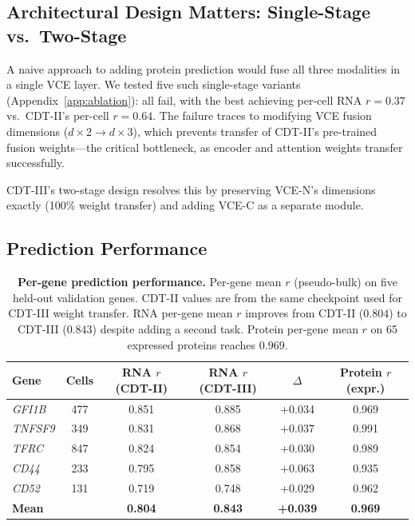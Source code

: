 \documentclass{article}
\begin{document}
\subsection{Architectural Design Matters: Single-Stage vs.\ Two-Stage}
\label{sec:ablation}

A naive approach to adding protein prediction would fuse all three modalities in a single VCE layer. We tested five such single-stage variants (Appendix~\ref{app:ablation}): all fail, with the best achieving per-cell RNA $r = 0.37$ vs.\ CDT-II's per-cell $r = 0.64$. The failure traces to modifying VCE fusion dimensions ($d \times 2 \to d \times 3$), which prevents transfer of CDT-II's pre-trained fusion weights---the critical bottleneck, as encoder and attention weights transfer successfully.

CDT-III's two-stage design resolves this by preserving VCE-N's dimensions exactly (100\% weight transfer) and adding VCE-C as a separate module.

\subsection{Prediction Performance}
\label{sec:prediction}

\begin{table}[t]
\centering
\caption{\textbf{Per-gene prediction performance.} Per-gene mean $r$ (pseudo-bulk) on five held-out validation genes. CDT-II values are from the same checkpoint used for CDT-III weight transfer. RNA per-gene mean $r$ improves from CDT-II ($0.804$) to CDT-III ($0.843$) despite adding a second task. Protein per-gene mean $r$ on 65 expressed proteins reaches $0.969$.}
\label{tab:prediction}
\begin{tabular}{lccccc}
\toprule
Gene & Cells & RNA $r$ (CDT-II) & RNA $r$ (CDT-III) & $\Delta$ & Protein $r$ (expr.) \\
\midrule
\textit{GFI1B} & 477 & 0.851 & 0.885 & +0.034 & 0.969 \\
\textit{TNFSF9} & 349 & 0.831 & 0.868 & +0.037 & 0.991 \\
\textit{TFRC} & 847 & 0.824 & 0.854 & +0.030 & 0.989 \\
\textit{CD44} & 233 & 0.795 & 0.858 & +0.063 & 0.935 \\
\textit{CD52} & 131 & 0.719 & 0.748 & +0.029 & 0.962 \\
\midrule
\textbf{Mean} & & \textbf{0.804} & \textbf{0.843} & \textbf{+0.039} & \textbf{0.969} \\
\bottomrule
\end{tabular}
\end{table}
\end{document}
